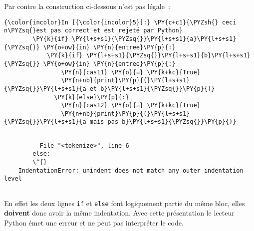     Par contre la construction ci-dessous n'est pas légale~:

    \begin{Verbatim}[commandchars=\\\{\}]
{\color{incolor}In [{\color{incolor}5}]:} \PY{c+c1}{\PYZsh{} ceci n\PYZsq{}est pas correct et est rejeté par Python}
        \PY{k}{if} \PY{l+s+s1}{\PYZsq{}}\PY{l+s+s1}{a}\PY{l+s+s1}{\PYZsq{}} \PY{o+ow}{in} \PY{n}{entree}\PY{p}{:}
            \PY{k}{if} \PY{l+s+s1}{\PYZsq{}}\PY{l+s+s1}{b}\PY{l+s+s1}{\PYZsq{}} \PY{o+ow}{in} \PY{n}{entree}\PY{p}{:}
                \PY{n}{cas11} \PY{o}{=} \PY{k+kc}{True}
                \PY{n+nb}{print}\PY{p}{(}\PY{l+s+s1}{\PYZsq{}}\PY{l+s+s1}{a et b}\PY{l+s+s1}{\PYZsq{}}\PY{p}{)}
              \PY{k}{else}\PY{p}{:}
                \PY{n}{cas12} \PY{o}{=} \PY{k+kc}{True}
                \PY{n+nb}{print}\PY{p}{(}\PY{l+s+s1}{\PYZsq{}}\PY{l+s+s1}{a mais pas b}\PY{l+s+s1}{\PYZsq{}}\PY{p}{)}
\end{Verbatim}


    \begin{Verbatim}[commandchars=\\\{\}]

          File "<tokenize>", line 6
        else:
        \^{}
    IndentationError: unindent does not match any outer indentation level
    

    \end{Verbatim}

    En effet les deux lignes \texttt{if} et \texttt{else} font logiquement
partie du même bloc, elles \textbf{doivent} donc avoir la même
indentation. Avec cette présentation le lecteur Python émet une erreur
et ne peut pas interpréter le code.